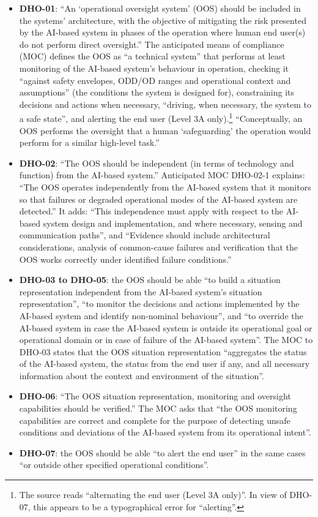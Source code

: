 \documentclass{aer}
\begin{document}
\begin{itemize}
\item \textbf{DHO-01}: ``An `operational oversight system' (OOS) should be included in the systems' architecture, with the objective of mitigating the risk presented by the AI-based system in phases of the operation where human end user(s) do not perform direct oversight.'' The anticipated means of compliance (MOC) defines the OOS as ``a technical system'' that performs at least monitoring of the AI-based system's behaviour in operation, checking it ``against safety envelopes, ODD/OD ranges and operational context and assumptions'' (the conditions the system is designed for), constraining its decisions and actions when necessary, ``driving, when necessary, the system to a safe state'', and alerting the end user (Level 3A only).\footnote{The source reads ``alternating the end user (Level 3A only)''. In view of DHO-07, this appears to be a typographical error for ``alerting''.} ``Conceptually, an OOS performs the oversight that a human `safeguarding' the operation would perform for a similar high-level task.''
\item \textbf{DHO-02}: ``The OOS should be independent (in terms of technology and function) from the AI-based system.'' Anticipated MOC DHO-02-1 explains: ``The OOS operates independently from the AI-based system that it monitors so that failures or degraded operational modes of the AI-based system are detected.'' It adds: ``This independence must apply with respect to the AI-based system design and implementation, and where necessary, sensing and communication paths'', and ``Evidence should include architectural considerations, analysis of common-cause failures and verification that the OOS works correctly under identified failure conditions.''
\item \textbf{DHO-03 to DHO-05}: the OOS should be able ``to build a situation representation independent from the AI-based system's situation representation'', ``to monitor the decisions and actions implemented by the AI-based system and identify non-nominal behaviour'', and ``to override the AI-based system in case the AI-based system is outside its operational goal or operational domain or in case of failure of the AI-based system''. The MOC to DHO-03 states that the OOS situation representation ``aggregates the status of the AI-based system, the status from the end user if any, and all necessary information about the context and environment of the situation''.
\item \textbf{DHO-06}: ``The OOS situation representation, monitoring and oversight capabilities should be verified.'' The MOC asks that ``the OOS monitoring capabilities are correct and complete for the purpose of detecting unsafe conditions and deviations of the AI-based system from its operational intent''.
\item \textbf{DHO-07}: the OOS should be able ``to alert the end user'' in the same cases ``or outside other specified operational conditions''.
\end{itemize}
\end{document}

